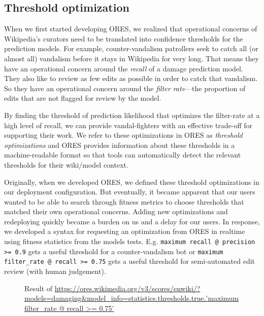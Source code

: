 \subsection{Threshold optimization}
When we first started developing ORES, we realized that operational concerns of Wikipedia's curators need to be translated into confidence thresholds for the prediction models.  For example, counter-vandalism patrollers seek to catch all (or almost all) vandalism before it stays in Wikipedia for very long.  That means they have an operational concern around the \emph{recall} of a damage prediction model.  They also like to review as few edits as possible in order to catch that vandalism.  So they have an operational concern around the \emph{filter rate}---the proportion of edits that are not flagged for review by the model\cite{halfaker2016notes}.

By finding the threshold of prediction likelihood that optimizes the filter-rate at a high level of recall, we can provide vandal-fighters with an effective trade-off for supporting their work.  We refer to these optimizations in ORES as \emph{threshold optimizations} and ORES provides information about these thresholds in a machine-readable format so that tools can automatically detect the relevant thresholds for their wiki/model context.

Originally, when we developed ORES, we defined these threshold optimizations in our deployment configuration.  But eventually, it became apparent that our users wanted to be able to search through fitness metrics to choose thresholds that matched their own operational concerns.  Adding new optimizations and redeploying quickly became a burden on us and a delay for our users.  In response, we developed a syntax for requesting an optimization from ORES in realtime using fitness statistics from the models tests. E.g. \texttt{maximum recall @ precision >= 0.9} gets a useful threshold for a counter-vandalism bot or \texttt{maximum filter\_rate @ recall >= 0.75} gets a useful threshold for semi-automated edit review (with human judgement).

\begin{figure}[htbp]
        \caption{Result of \url{https://ores.wikimedia.org/v3/scores/enwiki/?models=damaging&model_info=statistics.thresholds.true.'maximum filter_rate @ recall >= 0.75'}}
        \label{fig:english_damaging_threshold_optimization}
\end{figure}

